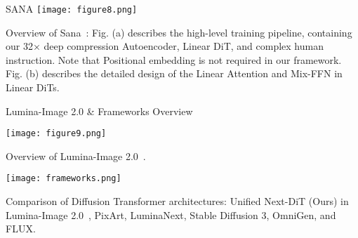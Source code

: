 \begin{refsection}
  \begin{frame}{SANA}
    \centering
    \texttt{[image: figure8.png]}

    {\scriptsize
    Overview of Sana~\parencite{xieSANAEfficientHighResolution2024}: Fig. (a) describes the high-level training pipeline, containing our 32× deep compression Autoencoder, Linear DiT, and complex human instruction. Note that Positional embedding is not required in our framework. Fig. (b) describes the detailed design of the Linear Attention and Mix-FFN in Linear DiTs.
    }
    \bottomleftrefs
  \end{frame}
\end{refsection}

\begin{refsection}
  \begin{frame}{Lumina-Image 2.0 \& Frameworks Overview}
    \centering
    \begin{minipage}{0.48\linewidth}
      \centering
      \texttt{[image: figure9.png]}

      {\scriptsize
      Overview of Lumina-Image 2.0~\parencite{qinLuminaImage20Unified2025}.
      }
    \end{minipage}%
    \hfill
    \begin{minipage}{0.48\linewidth}
      \centering
      \texttt{[image: frameworks.png]}

      {\scriptsize
      Comparison of Diffusion Transformer architectures: Unified Next-DiT (Ours) in Lumina-Image 2.0~\parencite{qinLuminaImage20Unified2025}, PixArt, LuminaNext, Stable Diffusion 3, OmniGen, and FLUX.
      }
    \end{minipage}

    \bottomleftrefs
  \end{frame}
\end{refsection}